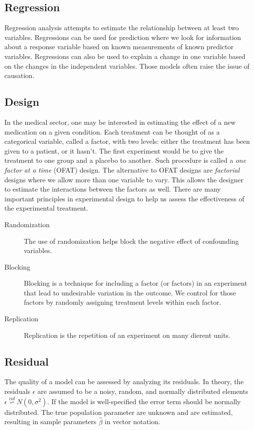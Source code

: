 \documentclass{article}
\begin{document}
\subsection{Regression}
Regression analysis attempts to estimate the relationship between at least two
variables. Regressions can be used for prediction where we look for information
about a response variable based on known measurements of known predictor variables.
Regressions can also be used to explain a change in one variable based on the changes
in the independent variables. Those models often raise the issue of causation.

\subsection{Design}
In the medical sector, one may be interested in estimating the effect of a new
medication on a given condition. Each treatment can be thought of as a categorical
variable, called a factor, with two levels: either the treatment has been given
to a patient, or it hasn't. The first experiment would be to give the treatment
to one group and a placebo to another. Such procedure is called a
\textit{one factor at a time} (OFAT) design. The alternative to OFAT designs are
\textit{factorial} designs where we allow more than one variable to vary.
This allows the designer to estimate the interactions between the factors as well.
There are many important principles in experimental design to help us assess
the effectiveness of the experimental treatment.

\begin{description}
    \item[Randomization] The use of randomization helps block the negative effect of
          confounding variables.
    \item[Blocking] Blocking is a technique for including a factor (or factors) in
          an experiment that lead to undesirable variation in the outcome. We control for
          those factors by randomly assigning treatment levels within each factor.
    \item[Replication] Replication is the repetition of an experiment on many
          dierent units.
\end{description}

\subsection{Residual}
The quality of a model can be assessed by analyzing its residuals. In theory, the
residuals $\epsilon$ are assumed to be a noisy, random, and normally distributed
elements $\epsilon \overset{iid}{\backsim }N(0, \sigma^{2})$. If the model is
well-specified the error term should be normally distributed. The true population
parameter are unknown and are estimated, resulting in sample parameters $\hat{\beta}$
in vector notation.
\end{document}
